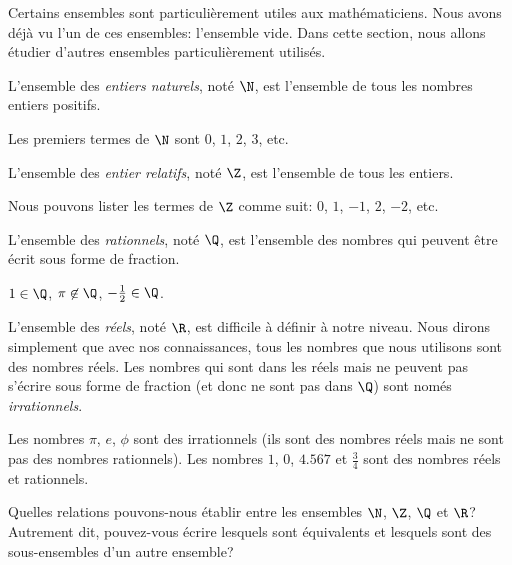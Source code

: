 Certains ensembles sont particulièrement utiles aux mathématiciens. Nous avons déjà vu l'un de ces ensembles: l'ensemble vide. Dans cette section, nous allons étudier d'autres ensembles particulièrement utilisés.

\begin{definition}
    L'ensemble des \emph{entiers naturels}, noté $\N$, est l'ensemble de tous les nombres entiers positifs.
\end{definition}
\begin{eclairsissement}
    Les premiers termes de $\N$ sont $0$, $1$, $2$, $3$, etc.
\end{eclairsissement}

\begin{definition}
    L'ensemble des \emph{entier relatifs}, noté $\Z$, est l'ensemble de tous les entiers.
\end{definition}
\begin{eclairsissement}
    Nous pouvons lister les termes de $\Z$ comme suit: $0$, $1$, $-1$, $2$, $-2$, etc.
\end{eclairsissement}

\begin{definition}
    L'ensemble des \emph{rationnels}, noté $\Q$, est l'ensemble des nombres qui peuvent être écrit sous forme de fraction.
\end{definition}
\begin{exemple}
    $1\in \Q$, $\pi \not\in \Q$, $-\frac12\in \Q$.
\end{exemple}

\begin{definition}
    L'ensemble des \emph{réels}, noté $\R$, est difficile à définir à notre niveau. Nous dirons simplement que avec nos connaissances, tous les nombres que nous utilisons sont des nombres réels. Les nombres qui sont dans les réels mais ne peuvent pas s'écrire sous forme de fraction (et donc ne sont pas dans $\Q$) sont només \emph{irrationnels}.
\end{definition}
\begin{eclairsissement}
    Les nombres $\pi$, $e$, $\phi$ sont des irrationnels (ils sont des nombres réels mais ne sont pas des nombres rationnels). Les nombres $1$, $0$, $4.567$ et $\frac34$ sont des nombres réels et rationnels.
\end{eclairsissement}

\vspace{1em}

\begin{exercice}
    Quelles relations pouvons-nous établir entre les ensembles $\N$, $\Z$, $\Q$ et $\R$? Autrement dit, pouvez-vous écrire lesquels sont équivalents et lesquels sont des sous-ensembles d'un autre ensemble?
\end{exercice}